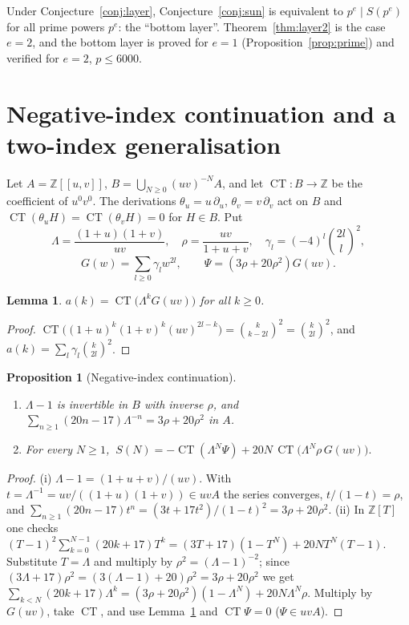 \documentclass[11pt]{amsart}
\newtheorem{proposition}[theorem]{Proposition}
\newtheorem{lemma}[theorem]{Lemma}
\theoremstyle{definition}
\newcommand{\Z}{\mathbb{Z}}
\newcommand{\CT}{\operatorname{CT}}
\begin{document}
Under Conjecture~\ref{conj:layer}, Conjecture~\ref{conj:sun} is equivalent to $p^e\mid S(p^e)$ for all
prime powers $p^e$: the ``bottom layer''. Theorem~\ref{thm:layer2} is the case $e=2$, and the
bottom layer is proved for $e=1$ (Proposition~\ref{prop:prime}) and verified for $e=2$,
$p\le6000$.

\section{Negative-index continuation and a two-index generalisation}\label{sec:neg}

Let $A=\Z[[u,v]]$, $B=\bigcup_{N\ge0}(uv)^{-N}A$, and let $\CT\colon B\to\Z$ be the coefficient of
$u^0v^0$. The derivations $\theta_u=u\,\partial_u$, $\theta_v=v\,\partial_v$ act on $B$ and
$\CT(\theta_uH)=\CT(\theta_vH)=0$ for $H\in B$. Put
\[
\Lambda=\frac{(1+u)(1+v)}{uv},\quad \rho=\frac{uv}{1+u+v},\quad
\gamma_l=(-4)^l\binom{2l}l^2,
\]
\[
G(w)=\sum_{l\ge0}\gamma_lw^{2l},\qquad \Psi=(3\rho+20\rho^2)G(uv).
\]

\begin{lemma}\label{lem:ct2}
$a(k)=\CT\big(\Lambda^kG(uv)\big)$ for all $k\ge0$.
\end{lemma}

\begin{proof}
$\CT\big((1+u)^k(1+v)^k(uv)^{2l-k}\big)=\binom k{k-2l}^2=\binom k{2l}^2$, and
$a(k)=\sum_l\gamma_l\binom k{2l}^2$.
\end{proof}

\begin{proposition}[Negative-index continuation]\label{prop:neg}
\begin{enumerate}[label=(\roman*)]
\item $\Lambda-1$ is invertible in $B$ with inverse $\rho$, and
$\sum_{n\ge1}(20n-17)\Lambda^{-n}=3\rho+20\rho^2$ in $A$.
\item For every $N\ge1$,
$\ S(N)=-\CT(\Lambda^N\Psi)+20N\,\CT\big(\Lambda^N\rho\,G(uv)\big).$
\end{enumerate}
\end{proposition}

\begin{proof}
(i) $\Lambda-1=(1+u+v)/(uv)$. With $t=\Lambda^{-1}=uv/((1+u)(1+v))\in uvA$ the series converges,
$t/(1-t)=\rho$, and $\sum_{n\ge1}(20n-17)t^n=(3t+17t^2)/(1-t)^2=3\rho+20\rho^2$.
(ii) In $\Z[T]$ one checks
$(T-1)^2\sum_{k=0}^{N-1}(20k+17)T^k=(3T+17)(1-T^N)+20NT^N(T-1)$. Substitute $T=\Lambda$ and
multiply by $\rho^2=(\Lambda-1)^{-2}$; since $(3\Lambda+17)\rho^2=(3(\Lambda-1)+20)\rho^2
=3\rho+20\rho^2$ we get
$\sum_{k<N}(20k+17)\Lambda^k=(3\rho+20\rho^2)(1-\Lambda^N)+20N\Lambda^N\rho$.
Multiply by $G(uv)$, take $\CT$, and use Lemma~\ref{lem:ct2} and $\CT\Psi=0$ ($\Psi\in uvA$).
\end{proof}
\end{document}
